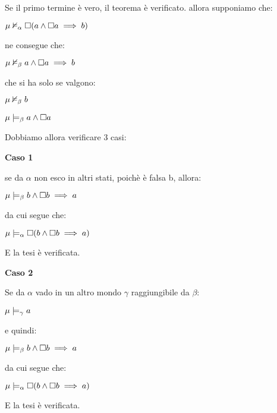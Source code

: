 Se il primo termine è vero, il teorema è verificato. allora supponiamo
che:

$\mu\nvDash_{\alpha}\square(a\wedge\square a\implies b)$

ne consegue che:

$\mu\nvDash_{\beta}a\wedge\square a\implies b$

che si ha solo se valgono:

$\mu\nvDash_{\beta}b$

$\mu\models_{\beta}a\wedge\square a$

Dobbiamo allora verificare 3 casi:

\textbf{Caso 1 }

se da $\alpha$ non esco in altri stati, poichè è falsa b, allora:

$\mu\models_{\beta}b\wedge\square b\implies a$

da cui segue che:

$\mu\models_{\alpha}\square(b\wedge\square b\implies a)$

E la tesi è verificata.

\begin{center} 
\end{center}

\textbf{Caso 2 }

Se da $\alpha$ vado in un altro mondo $\gamma$ raggiungibile da
$\beta$:

$\mu\models_{\gamma}a$

e quindi:

$\mu\models_{\beta}b\wedge\square b\implies a$

da cui segue che:

$\mu\models_{\alpha}\square(b\wedge\square b\implies a)$

E la tesi è verificata.

